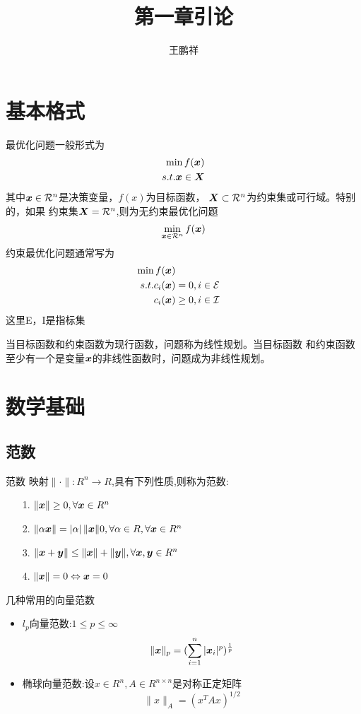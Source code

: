 \documentclass{article}
\begin{document}
\title{第一章引论}
\author{王鹏祥}
\date{\chntoday}
\maketitle
\tableofcontents
\newpage

\section{基本格式}
最优化问题一般形式为
\begin{align}
\min f({\boldsymbol x}) \\
s.t. {\boldsymbol x} \in {\boldsymbol X}
\end{align}
其中${\boldsymbol x} \in {\mathcal R}^n$是决策变量，$f(x)$为目标函数，
${\boldsymbol X} \subset {\mathcal R}^n$为约束集或可行域。特别的，如果
约束集${\boldsymbol X} = {\mathcal R}^n$,则为无约束最优化问题
$$
\min_{{\boldsymbol x} \in {\mathcal R}^n} f({\boldsymbol x})
$$
约束最优化问题通常写为
\begin{align*}
\min f({\boldsymbol x}) \\
s.t. c_i({\boldsymbol x}) &= 0 , i \in {\mathcal E} \\
     c_i({\boldsymbol x}) &\geq 0 , i \in {\mathcal I}
\end{align*}
这里E，I是指标集

当目标函数和约束函数为现行函数，问题称为线性规划。当目标函数
和约束函数至少有一个是变量${\boldsymbol x}$的非线性函数时，问题成为非线性规划。

\section{数学基础}
\subsection{范数}
\begin{definition}{范数}
映射$\| \cdot \| : R^n \rightarrow R$,具有下列性质,则称为范数:
\begin{itemize}
\item[1.] $\| {\boldsymbol x} \| \geq 0 , \forall {\boldsymbol x} \in R^n$ 
\item[2.] $\| \alpha {\boldsymbol x}  \| = \left| \alpha \right| \| {\boldsymbol x} \| 0 , \forall \alpha \in R,\forall {\boldsymbol x} \in R^n$ 
\item[3.] $\| {\boldsymbol x} + {\boldsymbol y} \| \leq \| {\boldsymbol x} \| +\| {\boldsymbol y} \| , \forall {\boldsymbol x},{\boldsymbol y} \in R^n$ 
\item[4.] $\| {\boldsymbol x} \| = 0 \Leftrightarrow {\boldsymbol x} = 0$ 
\end{itemize}
\end{definition}

几种常用的向量范数
\begin{itemize}
\item $l_p$向量范数:$1 \leq p \leq \infty $
$$
\| {\boldsymbol x} \|_p = (\sum_{i=1}^n |{\boldsymbol x}_i|^p)^{\frac{1}{p}} 
$$
\item 椭球向量范数:设$x \in R^n,A \in R^{n \times n}$是对称正定矩阵
$$
\|x\|_A = (x^T A x)^{1/2}
$$
\end{itemize}
\end{document}
